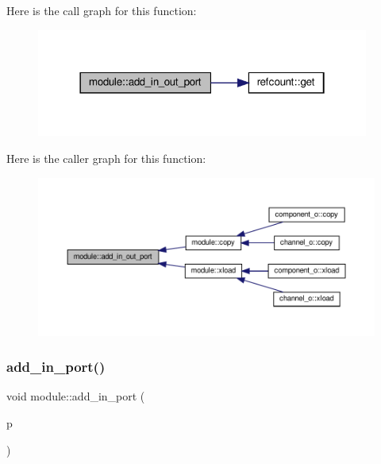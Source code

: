 Here is the call graph for this function\+:
\nopagebreak
\begin{figure}[H]
\begin{center}
\leavevmode
\includegraphics[width=310pt]{d0/dd3/classmodule_a4faf421d00ba2c16a003d6ef6ae41d75_cgraph}
\end{center}
\end{figure}
Here is the caller graph for this function\+:
\nopagebreak
\begin{figure}[H]
\begin{center}
\leavevmode
\includegraphics[width=350pt]{d0/dd3/classmodule_a4faf421d00ba2c16a003d6ef6ae41d75_icgraph}
\end{center}
\end{figure}
\mbox{\label{classmodule_a0d2631447deb34621ff56d33e2d9ba13}} 
\subsubsection{\texorpdfstring{add\+\_\+in\+\_\+port()}{add\_in\_port()}}
{\footnotesize\ttfamily void module\+::add\+\_\+in\+\_\+port (\begin{DoxyParamCaption}\item[{\hyperlink{structural__objects_8hpp_a8ea5f8cc50ab8f4c31e2751074ff60b2}{structural\+\_\+object\+Ref}}]{p }\end{DoxyParamCaption})}



